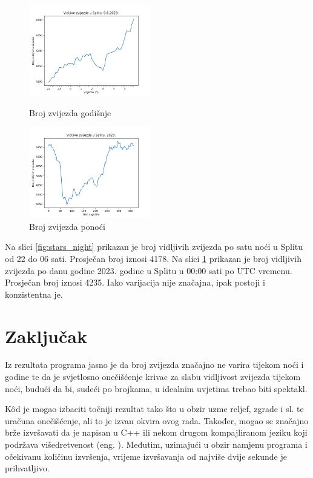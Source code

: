 \begin{figure}[h]
  \begin{minipage}[t]{0.48\linewidth}
    \centering
    \includegraphics[height=150px]{assets/plt-stars_night.png}
    \caption{Broj zvijezda godišnje}\label{fig:stars_night}
  \end{minipage}
  \begin{minipage}[t]{0.48\linewidth}
    \centering
    \includegraphics[height=150px]{assets/plt-stars_year.png}
    \caption{Broj zvijezda ponoći}\label{fig:stars_year}
  \end{minipage}
\end{figure}

Na slici \ref{fig:stars_night} prikazan je broj vidljivih zvijezda po satu noći u Splitu od 22 do 06 sati. Prosječan broj iznosi 4178. Na slici \ref{fig:stars_year} prikazan je broj vidljivih zvijezda po danu godine 2023. godine u Splitu u 00:00 sati po UTC vremenu. Prosječan broj iznosi 4235. Iako varijacija nije značajna, ipak postoji i konzistentna je.

\section{Zaključak}
Iz rezultata programa jasno je da broj zvijezda značajno ne varira tijekom noći i godine te da je svjetlosno onečišćenje krivac za slabu vidljivost zvijezda tijekom noći, budući da bi, sudeći po brojkama, u idealnim uvjetima trebao biti spektakl.

Kôd je mogao izbaciti točniji rezultat tako što u obzir uzme reljef, zgrade i sl. te uračuna onečišćenje, ali to je izvan okvira ovog rada. Također, mogao se značajno brže izvršavati da je napisan u C++ ili nekom drugom kompajliranom jeziku koji podržava višedretvenost (eng. ). Međutim, uzimajući u obzir namjenu programa i očekivanu količinu izvršenja, vrijeme izvršavanja od najviše dvije sekunde je prihvatljivo.


